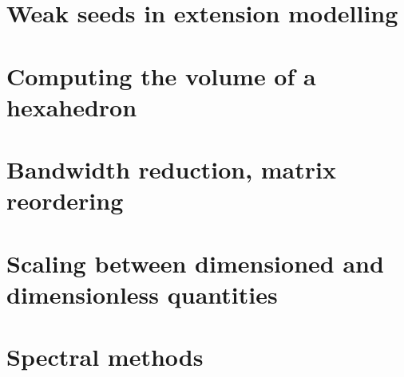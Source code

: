 \section{Weak seeds in extension modelling \label{ss:weakseeds}}  %
\newpage %
\section{Computing the volume of a hexahedron}  %
\newpage %
\section{Bandwidth reduction, matrix reordering}  %
\newpage %
\section{Scaling between dimensioned and dimensionless quantities}  %
\newpage %
\section{Spectral methods} 

